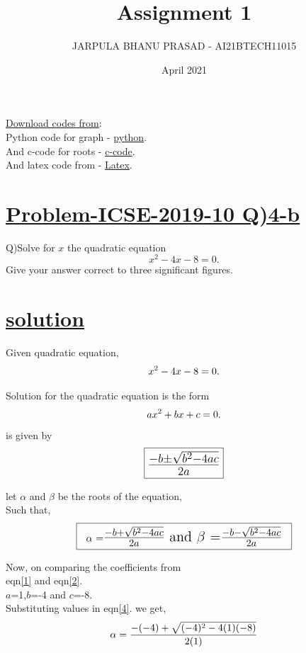 \documentclass[journal,12pt,twocolumn]{IEEEtran}
\title{Assignment 1}
\author{JARPULA BHANU PRASAD - AI21BTECH11015	}
\date{April 2021}
\begin{document}
\maketitle
\Large \underline{Download codes from}:\\
\large Python code for graph - \href{https://github.com/jarpula-Bhanu/Assinment-1/blob/main/quardratic.py}{python}.\\And c-code for roots -  \href{https://github.com/jarpula-Bhanu/Assinment-1/blob/main/roots.c}{c-code}.\\And latex code from - \href{https://github.com/jarpula-Bhanu/Assinment-1/blob/main/Assignment_1.tex}{Latex}.

\section{\Large \underline{Problem-ICSE-2019-10  Q)4-b}}
\large \noindent Q)Solve for $x$ the quadratic equation $$x^2-4x-8=0.$$ Give your answer correct to three significant figures.
\section{\large \underline{solution}}
Given quadratic equation,
\begin{align} \label{1}
\large x^2-4x-8=0.
\end{align}

\noindent Solution for the quadratic equation is the form 
\begin{align} \label{2}
 \large ax^2+bx+c=0.
\end{align} 
 is given by 
\begin{align} \label{3}
\framebox[1.1\width]{\LARGE $\frac{-b\pm\sqrt{b^2-4ac}}{2a}$}
\end{align}

let $\alpha$ and $\beta$ be the roots of the equation,\\Such that,
\begin{align} \label{4}
\framebox[1.1\width]{$\alpha$ =\Large $\frac{-b+\sqrt{b^2-4ac}}{2a}$ and  $\beta$ =\Large $\frac{-b-\sqrt{b^2-4ac}}{2a}$}
\end{align}

Now, on comparing the coefficients from 
\\eqn\eqref{1} and eqn\eqref{2}.
\\\large $a$=1,\large $b$=-4 and \large $c$=-8.
\\Substituting values in eqn\eqref{4}. we get,
\begin{align} \label{5}
\alpha =\Large \frac{-(-4)+\sqrt{(-4)^2-4(1)(-8)}}{2(1)}
\end{align}
\end{document}
